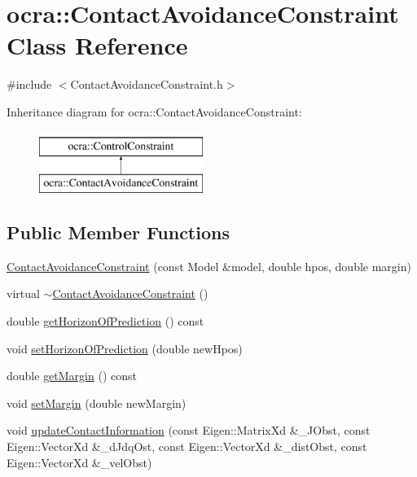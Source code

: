 \hypertarget{classocra_1_1ContactAvoidanceConstraint}{}\section{ocra\+:\+:Contact\+Avoidance\+Constraint Class Reference}
\label{classocra_1_1ContactAvoidanceConstraint}


{\ttfamily \#include $<$Contact\+Avoidance\+Constraint.\+h$>$}

Inheritance diagram for ocra\+:\+:Contact\+Avoidance\+Constraint\+:\begin{figure}[H]
\begin{center}
\leavevmode
\includegraphics[height=2.000000cm]{d4/d90/classocra_1_1ContactAvoidanceConstraint}
\end{center}
\end{figure}
\subsection*{Public Member Functions}
\begin{DoxyCompactItemize}
\item 
\hyperlink{classocra_1_1ContactAvoidanceConstraint_a77ef6f814bddd8ff8eabb9cf1272b4a3}{Contact\+Avoidance\+Constraint} (const Model \&model, double hpos, double margin)
\item 
virtual \hyperlink{classocra_1_1ContactAvoidanceConstraint_a57650df61143b936321c20d582f2457f}{$\sim$\+Contact\+Avoidance\+Constraint} ()
\item 
double \hyperlink{classocra_1_1ContactAvoidanceConstraint_a1282e8f163c4b53da93b435cdd16501f}{get\+Horizon\+Of\+Prediction} () const
\item 
void \hyperlink{classocra_1_1ContactAvoidanceConstraint_a667de1446a83d166c7979b6066dd0720}{set\+Horizon\+Of\+Prediction} (double new\+Hpos)
\item 
double \hyperlink{classocra_1_1ContactAvoidanceConstraint_acb8dff3c7d62c30edc180e3526ee8f94}{get\+Margin} () const
\item 
void \hyperlink{classocra_1_1ContactAvoidanceConstraint_a3504dbfab2c8e829bb73960891f4dd01}{set\+Margin} (double new\+Margin)
\item 
void \hyperlink{classocra_1_1ContactAvoidanceConstraint_a3d44cd52a5de9bc2d69da19b29a5d7f7}{update\+Contact\+Information} (const Eigen\+::\+Matrix\+Xd \&\+\_\+\+J\+Obst, const Eigen\+::\+Vector\+Xd \&\+\_\+d\+Jdq\+Ost, const Eigen\+::\+Vector\+Xd \&\+\_\+dist\+Obst, const Eigen\+::\+Vector\+Xd \&\+\_\+vel\+Obst)
\end{DoxyCompactItemize}
